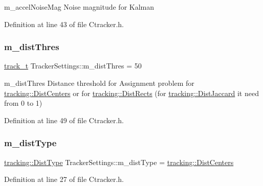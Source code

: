 m\+\_\+accel\+Noise\+Mag Noise magnitude for Kalman 



Definition at line 43 of file Ctracker.\+h.

\mbox{\label{struct_tracker_settings_a10e76ae03bd840f6c9180ce67faaa83c}} 
\subsubsection{\texorpdfstring{m\+\_\+dist\+Thres}{m\_distThres}}
{\footnotesize\ttfamily \mbox{\hyperlink{defines_8h_a7ce9c8817b42ab418e61756f579549ab}{track\+\_\+t}} Tracker\+Settings\+::m\+\_\+dist\+Thres = 50}



m\+\_\+dist\+Thres Distance threshold for Assignment problem for \mbox{\hyperlink{namespacetracking_a55743c5e18b9b228c4ba2587260b2502a30176bdc0b4f965c6812767a2fa52e1e}{tracking\+::\+Dist\+Centers}} or for \mbox{\hyperlink{namespacetracking_a55743c5e18b9b228c4ba2587260b2502a43af27628a9ee8e94a23c079eab5d448}{tracking\+::\+Dist\+Rects}} (for \mbox{\hyperlink{namespacetracking_a55743c5e18b9b228c4ba2587260b2502a731b827afcbde6eb19624ad6130b1798}{tracking\+::\+Dist\+Jaccard}} it need from 0 to 1) 



Definition at line 49 of file Ctracker.\+h.

\mbox{\label{struct_tracker_settings_a2633bd68c2d482a666a5d4bba580cca0}} 
\subsubsection{\texorpdfstring{m\+\_\+dist\+Type}{m\_distType}}
{\footnotesize\ttfamily \mbox{\hyperlink{namespacetracking_a55743c5e18b9b228c4ba2587260b2502}{tracking\+::\+Dist\+Type}} Tracker\+Settings\+::m\+\_\+dist\+Type = \mbox{\hyperlink{namespacetracking_a55743c5e18b9b228c4ba2587260b2502a30176bdc0b4f965c6812767a2fa52e1e}{tracking\+::\+Dist\+Centers}}}



Definition at line 27 of file Ctracker.\+h.

